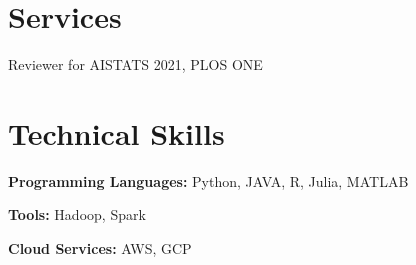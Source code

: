 \documentclass[11pt]{article}
\begin{document}


\section*{Services}

\hspace{-.25em}\begin{itemize*}[itemjoin={{ $\bullet$}}, label={}]
\item Reviewer for AISTATS 2021, PLOS ONE
\end{itemize*}


\section*{Technical Skills}

\hspace{-.25em}\begin{itemize*}[itemjoin={{ $\bullet$}}, label={}]
\item \textbf{Programming Languages:} Python, JAVA, R, Julia, MATLAB
\item \textbf{Tools:} Hadoop, Spark
\item \textbf{Cloud Services:} AWS, GCP
\end{itemize*}

\end{document}
